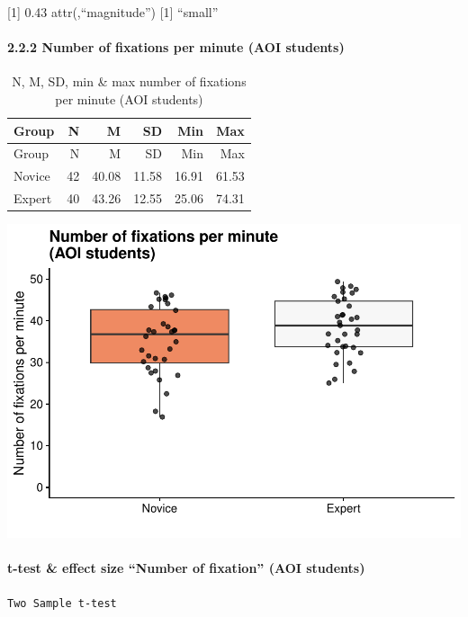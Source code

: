\documentclass[
]{article}
\begin{document}
{[}1{]} 0.43 attr(,``magnitude'') {[}1{]} ``small''

\paragraph{2.2.2 Number of fixations per minute (AOI
students)}\label{number-of-fixations-per-minute-aoi-students}

\begin{longtable}[]{@{}lrrrrr@{}}
\caption{N, M, SD, min \& max number of fixations per minute (AOI
students)}\tabularnewline
\toprule\noalign{}
Group & N & M & SD & Min & Max \\
\midrule\noalign{}
\endfirsthead
\toprule\noalign{}
Group & N & M & SD & Min & Max \\
\midrule\noalign{}
\endhead
\bottomrule\noalign{}
\endlastfoot
Novice & 42 & 40.08 & 11.58 & 16.91 & 61.53 \\
Expert & 40 & 43.26 & 12.55 & 25.06 & 74.31 \\
\end{longtable}

\includegraphics{expertise_2024_09_26_no_outlierdetection_MK_files/figure-latex/nof_students-1.pdf}

\paragraph{t-test \& effect size ``Number of fixation'' (AOI
students)}\label{t-test-effect-size-number-of-fixation-aoi-students}

\begin{verbatim}
Two Sample t-test
\end{verbatim}
\end{document}
